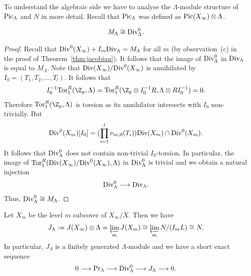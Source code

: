 To understand the algebraic side we have to analyse the $\Lambda$-module structure of $\textup{Pic}_\Lambda$ and $N$ in more detail. Recall that $\textup{Pic}_\Lambda$ was defined as $\textup{Pic}(X_\infty)\otimes \Lambda$. 

\begin{lemma} \label{lemma:Mlambda} 
	\[M_\Lambda\cong \textup{Div}^0_\Lambda.\]
\end{lemma}
\begin{proof}
	Recall that $\textup{Div}^0(X_\infty)+I_m\textup{Div}_\Lambda=M_\Lambda$ for all $m$ (by observation~(c) in the proof of Theorem~\ref{thm:jacobian}). It follows that the image of $\textup{Div}^0_\Lambda$ in $\textup{Div}_\Lambda$ is equal to $M_\Lambda$. Note that $\textup{Div}(X_\infty)/\textup{Div}^0(X_\infty)$ is annihilated by $I_0=(T_1,T_2,\dots, T_l)$. 
	It follows that
	\[I_0^{-1}\textup{Tor}_1^R(\Z_p,\Lambda)=\textup{Tor}_1^R(\Z_p\otimes I_0^{-1}R,\Lambda\otimes RI_0^{-1})=0.\]
	Therefore $\textup{Tor}_1^R(\Z_p,\Lambda)$ is torsion as its annihilator intersects with $I_0$ non-trivially.
	But 
	$$\textup{Div}^0(X_m)[I_0]=(\prod_{i=1}^l\nu_{m,0}(T_i))\textup{Div}(X_m)\cap \textup{Div}^0(X_m).$$
	It follows that $\textup{Div}^0_\Lambda$ does not contain non-trivial $I_0$-torsion. In particular, the image of 
	$\textup{Tor}_1^R(\textup{Div}(X_\infty)/\textup{Div}^0(X_\infty),\Lambda)$ in $\textup{Div}^0_\Lambda$ is trivial and we obtain a natural injection 
	\[\textup{Div}^0_\Lambda\longrightarrow \textup{Div}_\Lambda.\]
	Thus, $\textup{Div}^0_\Lambda\cong M_\Lambda$. 
\end{proof}
\begin{lemma}
	\label{lemma:projective-limit}
	Let $X_m$ be the level $m$ subcover of $X_\infty/X$. Then we have
	\[J_\Lambda:=J(X_\infty)\otimes \Lambda=\varprojlim_{m}J(X_m) \cong \varprojlim_m N/(I_m L) \cong N.\] 
	In particular, $J_\Lambda$ is a finitely generated $\Lambda$-module and we have a short exact sequence
	\[0\longrightarrow \textup{Pr}_\Lambda\longrightarrow \textup{Div}^0_\Lambda\longrightarrow J_\Lambda\longrightarrow 0.\]
\end{lemma} 

